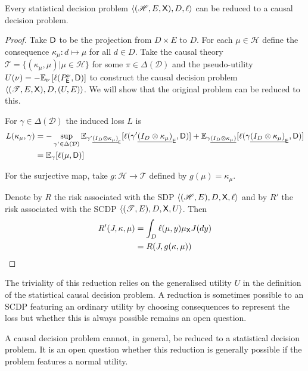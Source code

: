 \begin{theorem}\label{th:sdp_to_cdp}
Every statistical decision problem $\langle (\mathscr{H},E,\mathsf{X}),D,\ell\rangle$ can be reduced to a causal decision problem.
\end{theorem}
\begin{proof}
Take $\mathsf{D}$ to be the projection from $D\times E$ to $D$. For each $\mu\in \mathscr{H}$ define the consequence $\kappa_\mu:d\mapsto \mu$ for all $d\in D$. Take the causal theory $\mathscr{T}=\{(\kappa_\mu,\mu)|\mu\in \mathscr{H}\}$ for some $\pi\in \Delta(\mathcal{D})$ and the pseudo-utility $U(\nu) = -\mathbb{E}_\nu \left[\ell(P^\nu_{\mathsf{E}},\mathsf{D})\right]$ to construct the causal decision problem $\langle (\mathscr{T},E,\mathsf{X}),D,(U,E)\rangle$. We will show that the original problem can be reduced to this.

For $\gamma\in \Delta(\mathcal{D})$ the induced loss $L$ is
\begin{align}
    L(\kappa_\mu,\gamma) &= -\sup_{\gamma'\in \Delta(\mathcal{D})} \mathbb{E}_{\gamma' \underline{(I_D\otimes \kappa_\mu)}_{\mathsf{E}}}[\ell(\gamma'\underline{(I_D\otimes \kappa_\mu)}_{\mathsf{E}},\mathsf{D})] + \mathbb{E}_{\gamma \underline{(I_D\otimes \kappa_\mu)}}[\ell(\gamma \underline{(I_D\otimes \kappa_\mu)}_{\mathsf{E}},\mathsf{D})]\\
                     &= \mathbb{E}_{\gamma}[\ell(\mu,\mathsf{D})]
\end{align}

For the surjective map, take $g:\mathscr{H}\to \mathscr{T}$ defined by $g(\mu)=\kappa_\mu$.

Denote by $R$ the risk associated with the SDP $\langle (\mathscr{H},E),D,\mathsf{X},\ell\rangle$ and by $R'$ the risk associated with the SCDP $\langle (\mathscr{T},E),D,\mathsf{X},U\rangle$. Then
\begin{align}
    R'(J,\kappa,\mu) &= \int_D \ell(\mu, y) \mu_{\mathsf{X}} J(dy)\\
                   &=R(J,g(\kappa,\mu))
\end{align}
\end{proof}

The triviality of this reduction relies on the generalised utility $U$ in the definition of the statistical causal decision problem. A reduction is sometimes possible to an SCDP featuring an ordinary utility by choosing consequences to represent the loss but whether this is always possible remains an open question.

A causal decision problem cannot, in general, be reduced to a statistical decision problem. It is an open question whether this reduction is generally possible if the problem features a normal utility.

